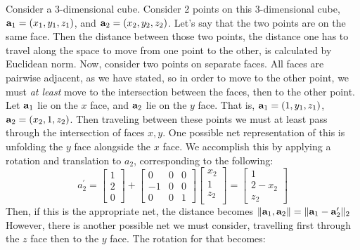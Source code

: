 Consider a 3-dimensional cube.  Consider 2 points on this 3-dimensional cube,
  ${\bf a}_1 = (x_1,y_1,z_1)$, and ${\bf a}_2 = (x_2,y_2,z_2)$. Let's say that the two points are
  on the same face.  Then the distance between those two points, the distance one has to travel
  along the space to move from one point to the other, is calculated by Euclidean norm.  Now,
  consider two points on separate faces.  All faces are pairwise adjacent, as we have stated, so
  in order to move to the other point, we must \emph{at least} move to the intersection between the
  faces, then to the other point.  Let ${\bf a}_1$ lie on the $x$ face, and ${\bf a}_2$ lie on the
  $y$ face.  That is, ${\bf a}_1 = (1, y_1, z_1)$, ${\bf a}_2 = (x_2, 1, z_2)$.  Then traveling
  between these points we must at least pass through the intersection of faces $x,y$.  One possible
  net representation of this is unfolding the $y$ face alongside the $x$ face.  We accomplish this
  by applying a rotation and translation to $a_2$, corresponding to the following:
  \begin{equation}
    \label{eq:1drotation}
    a_2^{\prime} = \begin{bmatrix}
    1 \\
    2 \\
    0
    \end{bmatrix}
    +
    \begin{bmatrix}
    0  & 0 & 0 \\
    -1 & 0 & 0 \\
    0  & 0 & 1
    \end{bmatrix}
    \begin{bmatrix}
    x_2 \\
    1 \\
    z_2 \\
    \end{bmatrix} = \begin{bmatrix}
    1 \\
    2 - x_2 \\
    z_2
    \end{bmatrix}
  \end{equation}
  Then, if this is the appropriate net, the distance becomes
  $\lVert {\bf a}_1,{\bf a}_2\rVert = \lVert {\bf a}_1 - {\bf a}_2^{\prime}\rVert_2$ However, there
  is another possible net we must consider, travelling first through the $z$ face then to the $y$
  face.  The rotation for that becomes:
